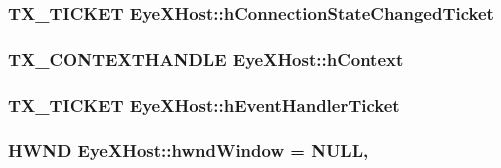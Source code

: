 \subsubsection[{h\+Connection\+State\+Changed\+Ticket}]{\setlength{\rightskip}{0pt plus 5cm}T\+X\+\_\+\+T\+I\+C\+K\+E\+T Eye\+X\+Host\+::h\+Connection\+State\+Changed\+Ticket\hspace{0.3cm}{\ttfamily [private]}}\label{class_eye_x_host_a5d7aa14e1384f6c130027ca0ae1ae823}
\hypertarget{class_eye_x_host_aa25acc2fc272389da12f9cd22e3481aa}{}
\subsubsection[{h\+Context}]{\setlength{\rightskip}{0pt plus 5cm}T\+X\+\_\+\+C\+O\+N\+T\+E\+X\+T\+H\+A\+N\+D\+L\+E Eye\+X\+Host\+::h\+Context\hspace{0.3cm}{\ttfamily [private]}}\label{class_eye_x_host_aa25acc2fc272389da12f9cd22e3481aa}
\hypertarget{class_eye_x_host_a2b6ed6e26a4a695501165886230cfcab}{}
\subsubsection[{h\+Event\+Handler\+Ticket}]{\setlength{\rightskip}{0pt plus 5cm}T\+X\+\_\+\+T\+I\+C\+K\+E\+T Eye\+X\+Host\+::h\+Event\+Handler\+Ticket\hspace{0.3cm}{\ttfamily [private]}}\label{class_eye_x_host_a2b6ed6e26a4a695501165886230cfcab}
\hypertarget{class_eye_x_host_a9791baa4b1f20d3007d46d37e657ff43}{}
\subsubsection[{hwnd\+Window}]{\setlength{\rightskip}{0pt plus 5cm}H\+W\+N\+D Eye\+X\+Host\+::hwnd\+Window = N\+U\+L\+L\hspace{0.3cm}{\ttfamily [static]}, {\ttfamily [private]}}\label{class_eye_x_host_a9791baa4b1f20d3007d46d37e657ff43}
\hypertarget{class_eye_x_host_ad5318e87583fd9f98c8831a6f40b0a85}{}
